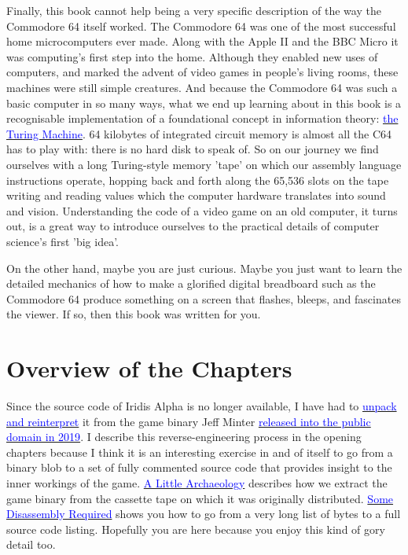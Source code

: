 Finally, this book cannot help being a very specific description of the way
the Commodore 64 itself worked. The Commodore 64 was one of the most successful
home microcomputers ever made. Along with the Apple II and the BBC Micro it was
computing's first step into the home. Although they enabled new uses of computers,
and marked the advent of video games in people's living rooms, these machines were still
simple creatures. And because the Commodore 64 was such a basic computer
in so many ways, what we end up learning about in this book is a recognisable implementation
of a foundational concept in information theory:
\href{https://en.wikipedia.org/wiki/Turing_machine}{\textcolor{blue}{the Turing Machine}}.
64 kilobytes of integrated circuit memory is almost all the C64 has to play with: there is no hard 
disk to speak of. So on our journey we find ourselves with a long Turing-style memory 'tape' on which
our assembly language instructions operate, hopping back and forth along the 
65,536 slots on the tape writing and reading values which the computer hardware
translates into sound and vision. Understanding the code of a video game on an old computer, it
turns out, is a great way to introduce ourselves to the practical details of
computer science's first 'big idea'.

On the other hand, maybe you are just curious. Maybe you just want to learn the detailed mechanics of how to make a
glorified digital breadboard such as the Commodore 64 produce something on a screen that
flashes, bleeps, and fascinates the viewer. If so, then this book was written for you. 

\section*{Overview of the Chapters}
Since the source code of Iridis Alpha is no longer available, I have had to
\href{https://github.com/mwenge/iridisalpha}{\textcolor{blue}{unpack and
reinterpret}} it from the game binary Jeff Minter
\href{https://www.llamasoftarchive.org/oldsite/llamasoft/cbm64/IridisAlpha.zip}{\textcolor{blue}{released
into the public domain in 2019}}. I describe this reverse-engineering process
in the opening chapters because I think it is an interesting exercise in and of
itself to go from a binary blob to a set of fully commented source code that
provides insight to the inner workings of the game.
\hyperref[sec:archaeo]{\textcolor{blue}{A Little Archaeology}} describes how we
extract the game binary from the cassette tape on which it was originally
distributed. \hyperref[sec:disassembly]{\textcolor{blue}{Some Disassembly
Required}} shows you how to go from a very long list of bytes to a full source
code listing. Hopefully you are here because you enjoy this kind of gory detail
too.


